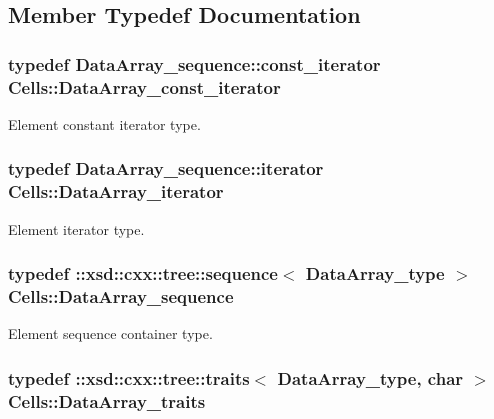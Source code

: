 \subsection{Member Typedef Documentation}
\hypertarget{classCells_ad01c81703074599471cd6159cdea1ac1}{
\subsubsection[{Data\+Array\+\_\+const\+\_\+iterator}]{\setlength{\rightskip}{0pt plus 5cm}typedef Data\+Array\+\_\+sequence\+::const\+\_\+iterator {\bf Cells\+::\+Data\+Array\+\_\+const\+\_\+iterator}}}\label{classCells_ad01c81703074599471cd6159cdea1ac1}


Element constant iterator type. 

\hypertarget{classCells_a1873efdee2bb668676d01a7a5010faa2}{
\subsubsection[{Data\+Array\+\_\+iterator}]{\setlength{\rightskip}{0pt plus 5cm}typedef Data\+Array\+\_\+sequence\+::iterator {\bf Cells\+::\+Data\+Array\+\_\+iterator}}}\label{classCells_a1873efdee2bb668676d01a7a5010faa2}


Element iterator type. 

\hypertarget{classCells_ae2856ec1cc2c6d6a2ccac9de9a22c7b7}{
\subsubsection[{Data\+Array\+\_\+sequence}]{\setlength{\rightskip}{0pt plus 5cm}typedef \+::xsd\+::cxx\+::tree\+::sequence$<$ {\bf Data\+Array\+\_\+type} $>$ {\bf Cells\+::\+Data\+Array\+\_\+sequence}}}\label{classCells_ae2856ec1cc2c6d6a2ccac9de9a22c7b7}


Element sequence container type. 

\hypertarget{classCells_ac35ecebe10914f3d35e85589e998462b}{
\subsubsection[{Data\+Array\+\_\+traits}]{\setlength{\rightskip}{0pt plus 5cm}typedef \+::xsd\+::cxx\+::tree\+::traits$<$ {\bf Data\+Array\+\_\+type}, char $>$ {\bf Cells\+::\+Data\+Array\+\_\+traits}}}\label{classCells_ac35ecebe10914f3d35e85589e998462b}


